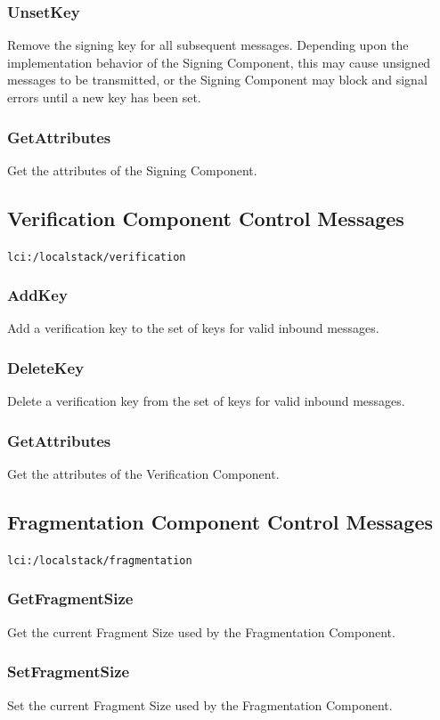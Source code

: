 \subsubsection{UnsetKey}
Remove the signing key for all subsequent messages.
Depending upon the implementation behavior of the Signing Component,
this may cause unsigned messages to be transmitted,
or the Signing Component may block and signal errors until a new key has been set.

\subsubsection{GetAttributes}
Get the attributes of the Signing Component.

\subsection{Verification Component Control Messages}
{\tt lci:/localstack/verification}

\subsubsection{AddKey}
Add a verification key to the set of keys for valid inbound messages.

\subsubsection{DeleteKey}
Delete a verification key from the set of keys for valid inbound messages.

\subsubsection{GetAttributes}
Get the attributes of the Verification Component.

\subsection{Fragmentation Component Control Messages}
{\tt lci:/localstack/fragmentation}

\subsubsection{GetFragmentSize}
Get the current Fragment Size used by the Fragmentation Component.

\subsubsection{SetFragmentSize}
Set the current Fragment Size used by the Fragmentation Component.

